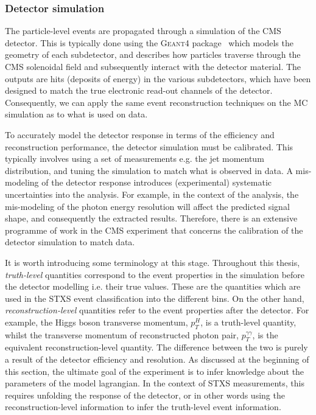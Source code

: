 \subsubsection{Detector simulation}
The particle-level events are propagated through a simulation of the CMS detector. This is typically done using the \textsc{Geant4} package~\cite{Agostinelli:2002hh} which models the geometry of each subdetector, and describes how particles traverse through the CMS solenoidal field and subsequently interact with the detector material. The outputs are hits (deposits of energy) in the various subdetectors, which have been designed to match the true electronic read-out channels of the detector. Consequently, we can apply the same event reconstruction techniques on the MC simulation as to what is used on data. 

To accurately model the detector response in terms of the efficiency and reconstruction performance, the detector simulation must be calibrated. This typically involves using a set of measurements e.g. the jet momentum distribution, and tuning the simulation to match what is observed in data. A mis-modeling of the detector response introduces (experimental) systematic uncertainties into the analysis. For example, in the context of the \Hgg analysis, the mis-modeling of the photon energy resolution will affect the predicted signal shape, and consequently the extracted results. Therefore, there is an extensive programme of work in the CMS experiment that concerns the calibration of the detector simulation to match data.

It is worth introducing some terminology at this stage. Throughout this thesis, \textit{truth-level} quantities correspond to the event properties in the simulation before the detector modelling i.e. their true values. These are the quantities which are used in the STXS event classification into the different bins. On the other hand, \textit{reconstruction-level} quantities refer to the event properties after the detector. For example, the Higgs boson transverse momentum, $p_T^H$, is a truth-level quantity, whilst the transverse momentum of reconstructed photon pair, $p_T^{\gamma\gamma}$, is the equivalent reconstruction-level quantity. The difference between the two is purely a result of the detector efficiency and resolution. As discussed at the beginning of this section, the ultimate goal of the experiment is to infer knowledge about the parameters of the model lagrangian. In the context of STXS measurements, this requires unfolding the response of the detector, or in other words using the reconstruction-level information to infer the truth-level event information.

